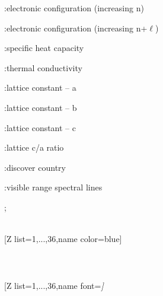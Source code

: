 {{\begin{minipage}{.55\linewidth}
\begin{itemlist}
\item{}:\hspace{.5ex}electronic configuration (increasing n)
\item{}:\hspace{.5ex}electronic configuration (increasing n+$\ell$)
\item{}:\hspace{.5ex}specific heat capacity
\item{}:\hspace{.5ex}thermal conductivity
\item{}:\hspace{.5ex}lattice constant -- a
\item{}:\hspace{.5ex}lattice constant -- b
\item{}:\hspace{.5ex}lattice constant -- c
\item{}:\hspace{.5ex}lattice c/a ratio
\item{}:\hspace{.5ex}discover country
\item{}:\hspace{.5ex}visible range spectral lines
\end{itemlist}
\end{minipage}
};}\vfill%
\\ [5pt][Z list={1,...,36},name color=blue]%
\\ [10pt]\makebox[\linewidth][c]{\scalebox{.6}{\pgfPT[Z list={1,...,36},name color=blue]}}%
\\ [5pt]\pgfPTendoption%
\vfill%
\newpage\ \\ [-32pt]%
\\ [5pt][Z list={1,...,36},name font=\string\tiny\string\itshape]%
\\ [10pt]\makebox[\linewidth][c]{\scalebox{.6}{\pgfPT[Z list={1,...,36},name font=\tiny\itshape]}}%
